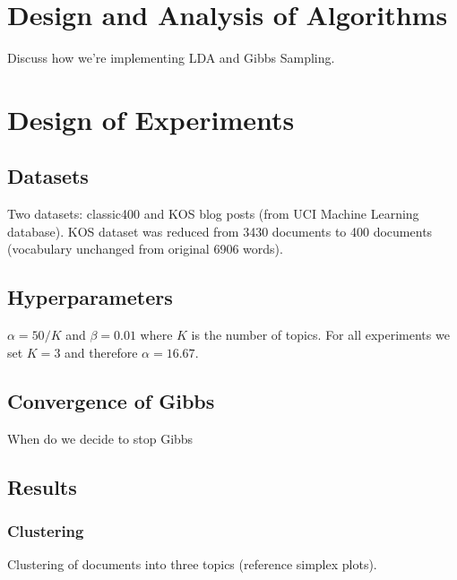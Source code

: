 \documentclass[10pt]{article}
\begin{document}
\section{Design and Analysis of Algorithms}
\label{sec:algorithms}

Discuss how we're implementing LDA and Gibbs Sampling.



\section{Design of Experiments}
\label{sec:experiments}

%
%
\subsection{Datasets}
Two datasets: classic400 and KOS blog posts (from UCI Machine Learning database). KOS dataset was reduced from 3430 documents to 400 documents (vocabulary unchanged from original 6906 words).


%
%
\subsection{Hyperparameters}
$\alpha = 50 / K$ and $\beta=0.01$ where $K$ is the number of topics. For all experiments we set $K=3$ and therefore $\alpha = 16.67$.


%
%
\subsection{Convergence of Gibbs}
When do we decide to stop Gibbs


%
%
\subsection{Results}

\subsubsection{Clustering}
Clustering of documents into three topics (reference simplex plots).
\end{document}
